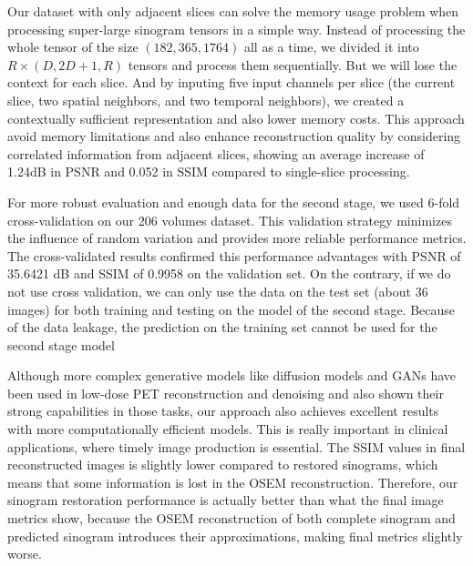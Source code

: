 \documentclass[aps,prb,preprint,groupedaddress,showkeys]{revtex4}
\begin{document}
Our dataset with only adjacent slices can solve the memory usage problem when processing super-large sinogram tensors in a simple way. Instead of processing the whole tensor of the size $(182, 365, 1764)$ all as a time, we divided it into $R\times(D, 2D+1, R)$ tensors and process them sequentially. But we will lose the context for each slice. And by inputing five input channels per slice (the current slice, two spatial neighbors, and two temporal neighbors), we created a contextually sufficient representation and also lower memory costs. This approach  avoid memory limitations and also enhance reconstruction quality by considering correlated information from adjacent slices, showing an average increase of 1.24dB in PSNR and 0.052 in SSIM compared to single-slice processing.

For more robust evaluation and enough data for the second stage, we used 6-fold cross-validation on our 206 volumes dataset. 
This validation strategy minimizes the influence of random variation and provides more reliable performance metrics. The cross-validated results confirmed this performance advantages with PSNR of 35.6421 dB and SSIM of 0.9958 on the validation set. 
On the contrary, if we do not use cross validation, we can only use the data on the test set (about 36 images) for both training and testing on the model of the second stage. Because of the data leakage, the prediction on the training set cannot be used for the second stage model 

Although more complex generative models like diffusion models and GANs have been used in low-dose PET reconstruction and denoising and also shown their strong capabilities in those tasks, our approach also achieves excellent results with more computationally efficient models. This is really important in clinical applications, where timely image production is essential.
The SSIM values in final reconstructed images is slightly lower compared to restored sinograms, which means that some information is lost in the OSEM reconstruction. 
Therefore, our sinogram restoration performance is actually better than what the final image metrics show, because the OSEM reconstruction of both complete sinogram and predicted sinogram introduces their approximations, making final metrics slightly worse.
\end{document}
